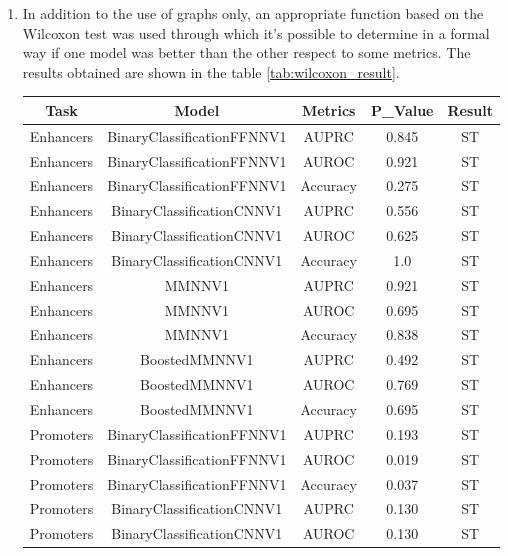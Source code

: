 \documentclass{article}
\begin{document}
\begin{enumerate}
    \item In addition to the use of graphs only, an appropriate function based on the Wilcoxon test was used through which it's possible to determine in a formal way if one model was better than the other respect to some metrics. The results obtained are shown in the table \ref{tab:wilcoxon_result}.
    \newline
    \begin{table}[!ht]
    \begin{center}
    \begin{tabular}{  c | c | c | c | c }
    \hline
    Task & Model & Metrics & P\_Value & Result\\
    \hline
    Enhancers & BinaryClassificationFFNNV1 & AUPRC & 0.845 & \acrshort{ST}\\
    Enhancers & BinaryClassificationFFNNV1 & AUROC & 0.921 & \acrshort{ST}\\
    Enhancers & BinaryClassificationFFNNV1 & Accuracy & 0.275 & \acrshort{ST}\\
    \hline
    Enhancers & BinaryClassificationCNNV1 & AUPRC & 0.556 & \acrshort{ST}\\
    Enhancers & BinaryClassificationCNNV1 & AUROC & 0.625 & \acrshort{ST}\\
    Enhancers & BinaryClassificationCNNV1 & Accuracy & 1.0 & \acrshort{ST}\\
    \hline
    Enhancers & MMNNV1 & AUPRC & 0.921 & \acrshort{ST}\\
    Enhancers & MMNNV1 & AUROC & 0.695 & \acrshort{ST}\\
    Enhancers & MMNNV1 & Accuracy & 0.838 & \acrshort{ST}\\
    \hline
    Enhancers & BoostedMMNNV1 & AUPRC & 0.492 & \acrshort{ST}\\
    Enhancers & BoostedMMNNV1 & AUROC & 0.769 & \acrshort{ST}\\
    Enhancers & BoostedMMNNV1 & Accuracy & 0.695 & \acrshort{ST}\\
    \hline
    Promoters & BinaryClassificationFFNNV1 & AUPRC & 0.193 & \acrshort{ST}\\
    Promoters & BinaryClassificationFFNNV1 & AUROC & 0.019 & \acrshort{ST}\\
    Promoters & BinaryClassificationFFNNV1 & Accuracy & 0.037 & \acrshort{ST}\\
    \hline
    Promoters & BinaryClassificationCNNV1 & AUPRC & 0.130 & \acrshort{ST}\\
    Promoters & BinaryClassificationCNNV1 & AUROC & 0.130 & \acrshort{ST}\\

\end{tabular}
\end{center}
\end{table}
\end{enumerate}
\end{document}
